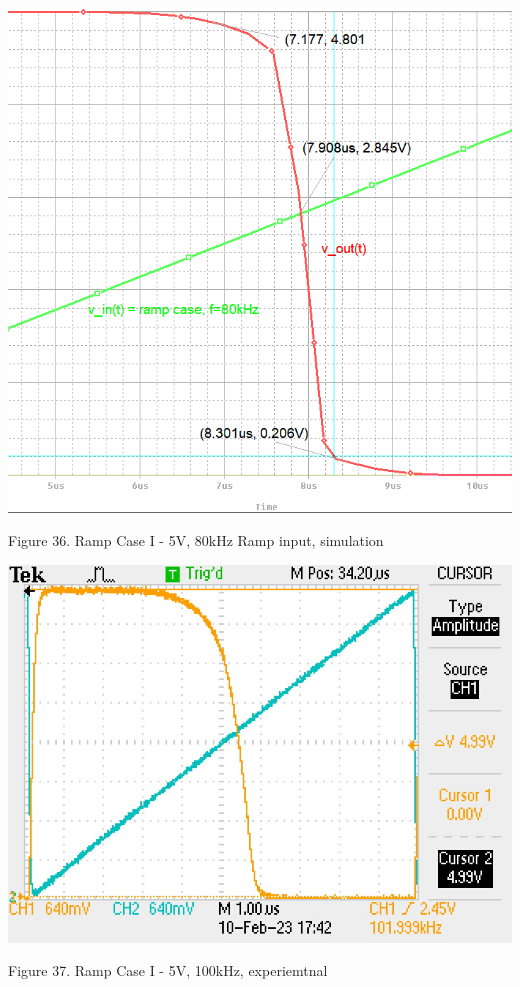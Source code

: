\documentclass[conference]{IEEEtran}
\begin{document}
\begin{center}
    \centerline{\includegraphics[scale = 0.42]{figures/rampcase1_results.png}}
    Figure 36. Ramp Case I - 5V, 80kHz Ramp input, simulation
\end{center}

\begin{center}
    \centerline{\includegraphics[scale = 0.9]{figures/rampcase1_experimental.JPG}}
    Figure 37. Ramp Case I - 5V, 100kHz, experiemtnal
\end{center} 
\end{document}
